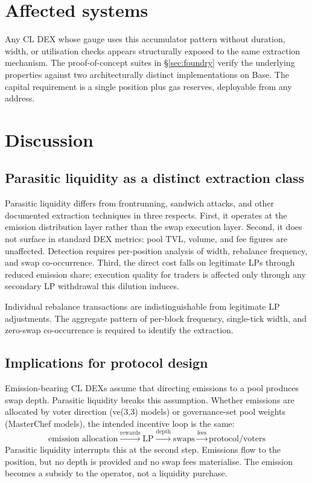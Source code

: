 \documentclass[11pt,a4paper]{article}
\theoremstyle{definition}
\begin{document}
\section{Affected systems}\label{sec:affected}

Any CL DEX whose gauge uses this accumulator pattern without duration, width, or utilisation checks appears structurally exposed to the same extraction mechanism. The proof-of-concept suites in \S\ref{sec:foundry} verify the underlying properties against two architecturally distinct implementations on Base. The capital requirement is a single position plus gas reserves, deployable from any address.

\section{Discussion}\label{sec:discussion}

\subsection{Parasitic liquidity as a distinct extraction class}\label{sec:distinct}

Parasitic liquidity differs from frontrunning, sandwich attacks, and other documented extraction techniques in three respects. First, it operates at the emission distribution layer rather than the swap execution layer. Second, it does not surface in standard DEX metrics: pool TVL, volume, and fee figures are unaffected. Detection requires per-position analysis of width, rebalance frequency, and swap co-occurrence. Third, the direct cost falls on legitimate LPs through reduced emission share; execution quality for traders is affected only through any secondary LP withdrawal this dilution induces.

Individual rebalance transactions are indistinguishable from legitimate LP adjustments. The aggregate pattern of per-block frequency, single-tick width, and zero-swap co-occurrence is required to identify the extraction.

\subsection{Implications for protocol design}\label{sec:implications}

Emission-bearing CL DEXs assume that directing emissions to a pool produces swap depth. Parasitic liquidity breaks this assumption. Whether emissions are allocated by voter direction (ve(3,3) models) or governance-set pool weights (MasterChef models), the intended incentive loop is the same:
$$\text{emission allocation} \xrightarrow{\text{rewards}} \text{LP} \xrightarrow{\text{depth}} \text{swaps} \xrightarrow{\text{fees}} \text{protocol/voters}$$
Parasitic liquidity interrupts this at the second step. Emissions flow to the position, but no depth is provided and no swap fees materialise. The emission becomes a subsidy to the operator, not a liquidity purchase.
\end{document}
